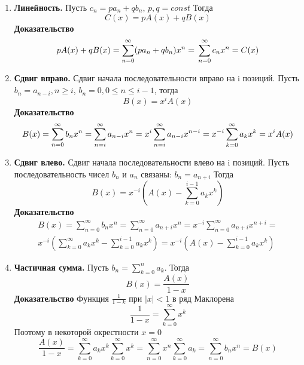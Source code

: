 \begin{enumerate}
    \item \textbf{Линейность.}
    Пусть $c_n = pa_n + qb_n$, $p, q = const$ Тогда 
    \begin{equation}
        \label{linear_p}
        C(x) = pA(x) + qB(x)
    \end{equation}
    \textbf{Доказательство}
    \begin{equation*}
        pA(x) + qB(x) = \sum_{n = 0}^{\infty} (pa_n + qb_n)x^n = \\
        \sum_{n=0}^{\infty} c_n x^n = C(x)
    \end{equation*}

    \item \textbf{Сдвиг вправо.}
    Сдвиг начала последовательности вправо на i позиций.
    Пусть $b_n = a_{n-i}, n \geq i$,  $b_n = 0, 0 \leq n \leq i-1$, тогда
    \begin{equation}
        \label{bias_right_p}
        B(x) = x^iA(x)
    \end{equation}
    \textbf{Доказательство}
    \begin{equation*}
        B(x) = \sum_{n = 0}^{\infty} b_n x^n = \sum_{n = i}^{\infty} a_{n-i}x^n = \\
        x^i \sum_{n = i}^{\infty} a_{n-i} x^{n-i} = x^{-i}\sum_{k = 0}^{\infty} a_k x^k = x^i A(x)
    \end{equation*}
    
    \item \textbf{Сдвиг влево.}
    Сдвиг начала последовательности влево на i позиций. Пусть последовательность чисел
    $b_n$ и $a_n$ связаны: $b_n = a_{n+i}$ Тогда
    \begin{equation}
        \label{bias_left_p}
        B(x) = x^{-i}(A(x) - \sum_{k = 0 }^{i - 1} a_k x^k)
    \end{equation}
    \textbf{Доказательство}
    \begin{multline*}
        B(x) = \sum_{n = 0}^{\infty} b_n x^n = \sum_{n = 0}^{\infty} a_{n+i} x^n =
        x^{-i} \sum_{n = 0}^{\infty} a_{n+i}x^{n+i} = \\
        x^{-i}(\sum_{k = 0}^{\infty} a_k x^k - 
        \sum_{k = 0}^{i-1} a_k x^k) = x^{-i}(A(x) - \sum_{k = 0}^{i-1} a_k x^k)    
    \end{multline*}

    \item \textbf{Частичная сумма.}
    Пусть $b_n = \sum_{k = 0}^{n} a_k$. Тогда
    \begin{equation}
        \label{partial_sum_p}
        B(x) = \frac{A(x)}{1-x}
    \end{equation}
    \textbf{Доказательство}
    Функция $\frac{1}{1-k}$ при $|x| < 1$ в ряд Маклорена
    \begin{equation*}
        \frac{1}{1 - x} = \sum_{k = 0}^{\infty} x^k
    \end{equation*}
    Поэтому в некоторой окрестности $x = 0$
    \begin{equation*}
        \frac{A(x)}{1-x} = \sum_{k = 0}^{\infty} a_k x^k \sum_{k = 0}^{\infty} x^k =
        \sum_{n = 0}^{\infty} x^n \sum_{k = 0}^{\infty} a_k = \sum_{n = 0}^{\infty} b_n x^n = B(x)
    \end{equation*}


\end{enumerate}
